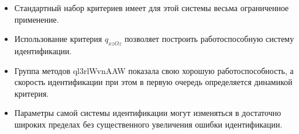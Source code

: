 \begin{itemize}

  \item
    Стандартный набор критериев имеет для этой системы
    весьма ограниченное применение.

  \item
    Использование критерия $q_{xzOz}$
    позволяет построить работоспособную систему идентификации.

  \item
    Группа методов ql3rlWvnAAW показала свою хорошую работоспособность,
    а скорость идентификации при этом в первую очередь определяется
    динамикой критерия.

  \item
    Параметры самой системы идентификации могут изменяться в достаточно широких
    пределах без существенного увеличения ошибки идентификации.

\end{itemize}





